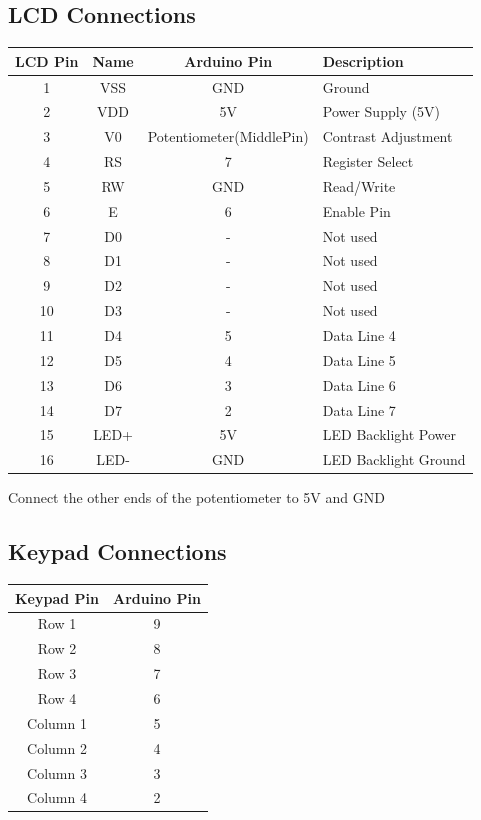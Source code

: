 \documentclass[journal]{IEEEtran}
\begin{document}
\subsection*{LCD Connections}
\begin{table}[H]
    \centering
    \begin{tabular}{|c|c|c|l|}
        \hline
        \textbf{LCD Pin} & \textbf{Name} & \textbf{Arduino Pin} & \textbf{Description} \\
        \hline
        1  & VSS   & GND  & Ground \\
        2  & VDD   & 5V   & Power Supply (5V) \\
        3  & V0    & Potentiometer(MiddlePin) & Contrast Adjustment \\
        4  & RS    & 7    & Register Select \\
        5  & RW    & GND  & Read/Write  \\
        6  & E     & 6    & Enable Pin \\
        7  & D0    & -    & Not used  \\
        8  & D1    & -    & Not used \\
        9  & D2    & -    & Not used \\
        10 & D3    & -    & Not used \\
        11 & D4    & 5    & Data Line 4 \\
        12 & D5    & 4    & Data Line 5 \\
        13 & D6    & 3    & Data Line 6 \\
        14 & D7    & 2    & Data Line 7 \\
        15 & LED+ & 5V  & LED Backlight Power \\
        16 & LED- & GND & LED Backlight Ground \\
        \hline
    \end{tabular}
\end{table}
Connect the other ends of the potentiometer to 5V and GND 
\subsection*{Keypad Connections}
\begin{table}[H]
    \centering
    \begin{tabular}{|c|c|}
        \hline
        \textbf{Keypad Pin} & \textbf{Arduino Pin}  \\
        \hline
        Row 1   & 9   \\
        Row 2   & 8   \\
        Row 3   & 7  \\
        Row 4   & 6  \\
        Column 1  & 5   \\
        Column 2  & 4   \\
        Column 3  & 3  \\
        Column 4  & 2  \\
        \hline
    \end{tabular}
\end{table}
\end{document}
